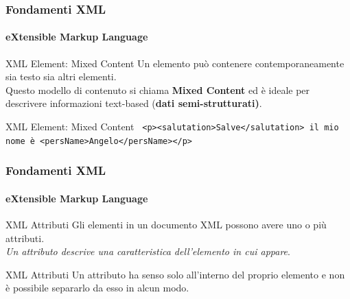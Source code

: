 \begin{frame}
    \frametitle{Fondamenti XML}
    \framesubtitle{eXtensible Markup Language}
    \addtocounter{nframe}{1}

	\begin{block}{XML Element: Mixed Content}
		Un elemento può contenere contemporaneamente sia testo sia altri elementi. 
		\\Questo modello di contenuto si chiama \textbf{Mixed Content} ed è ideale per descrivere informazioni text-based (\textbf{dati semi-strutturati)}.
	\end{block}

	\begin{block}{XML Element: Mixed Content}
		\texttt{
			<p><salutation>Salve</salutation> il mio nome è <persName>Angelo</persName></p>
			} 
	\end{block}


\end{frame}





\begin{frame}
    \frametitle{Fondamenti XML}
    \framesubtitle{eXtensible Markup Language}
    \addtocounter{nframe}{1}

	\begin{block}{XML Attributi}
		Gli elementi in un documento XML possono avere uno o più attributi.
		\\ \textit{Un attributo descrive una caratteristica dell'elemento in cui appare}.
	\end{block}

	\begin{block}{XML Attributi}
		Un attributo ha senso solo all'interno del proprio elemento e non è possibile separarlo da esso in alcun modo.
	\end{block}

\end{frame}


